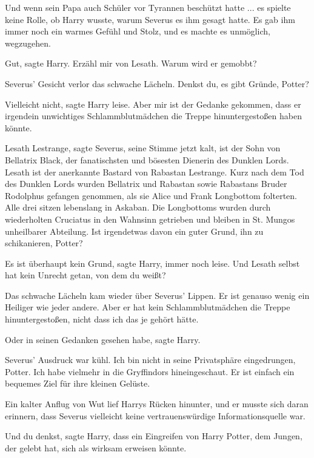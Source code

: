 Und wenn sein Papa auch Schüler vor Tyrannen beschützt hatte ... es spielte
keine Rolle, ob Harry wusste, warum Severus es ihm gesagt hatte. Es gab ihm
immer noch ein warmes Gefühl und Stolz, und es machte es unmöglich, wegzugehen.

\glqq{}Gut\grqq{}, sagte Harry. \glqq{}Erzähl mir von Lesath. Warum wird er
gemobbt?\grqq{}

Severus' Gesicht verlor das schwache Lächeln. \glqq{}Denkst du, es gibt Gründe,
Potter?\grqq{}

\glqq{}Vielleicht nicht\grqq{}, sagte Harry leise. \glqq{}Aber mir ist der
Gedanke gekommen, dass er irgendein unwichtiges Schlammblutmädchen die Treppe
hinuntergestoßen haben könnte.\grqq{}

\glqq{}Lesath Lestrange\grqq{}, sagte Severus, seine Stimme jetzt kalt,
\glqq{}ist der Sohn von Bellatrix Black, der fanatischsten und bösesten Dienerin
des Dunklen Lords. Lesath ist der anerkannte Bastard von Rabastan Lestrange.
Kurz nach dem Tod des Dunklen Lords wurden Bellatrix und Rabastan sowie
Rabastans Bruder Rodolphus gefangen genommen, als sie Alice und Frank Longbottom
folterten. Alle drei sitzen lebenslang in Askaban. Die Longbottoms wurden durch
wiederholten Cruciatus in den Wahnsinn getrieben und bleiben in St. Mungos
unheilbarer Abteilung. Ist irgendetwas davon ein guter Grund, ihn zu
schikanieren, Potter?\grqq{}

\glqq{}Es ist überhaupt kein Grund\grqq{}, sagte Harry, immer noch leise.
\glqq{}Und Lesath selbst hat kein Unrecht getan, von dem du weißt?\grqq{}

Das schwache Lächeln kam wieder über Severus' Lippen. \glqq{}Er ist genauso
wenig ein Heiliger wie jeder andere. Aber er hat kein Schlammblutmädchen die
Treppe hinuntergestoßen, nicht dass ich das je gehört hätte.\grqq{}

\glqq{}Oder in seinen Gedanken gesehen habe\grqq{}, sagte Harry.

Severus' Ausdruck war kühl. \glqq{}Ich bin nicht in seine Privatsphäre
eingedrungen, Potter. Ich habe vielmehr in die Gryffindors hineingeschaut. Er
ist einfach ein bequemes Ziel für ihre kleinen Gelüste.\grqq{}

Ein kalter Anflug von Wut lief Harrys Rücken hinunter, und er musste sich daran
erinnern, dass Severus vielleicht keine vertrauenswürdige Informationsquelle
war.

\glqq{}Und du denkst\grqq{}, sagte Harry, \glqq{}dass ein Eingreifen von Harry
Potter, dem Jungen, der gelebt hat, sich als wirksam erweisen könnte.\grqq{}

